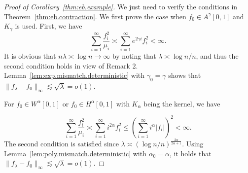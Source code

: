 \documentclass[12pt]{article}
\newcommand{\s}{\sum_{i=1}^{\infty}}
\theoremstyle{plain}
\theoremstyle{nonitalicremark}
\begin{document}
\begin{appendices}
\begin{proof}[Proof of Corollary~\ref{thm:eb.example}]
We just need to verify the conditions in Theorem~\ref{thm:eb.contraction}. We first prove the case when $f_0 \in A^\gamma[0,1]$ and $K_\gamma$ is used. First, we have
\begin{equation}
\s \frac{f_i^2}{\mu_i} \asymp \s e^{2\gamma i} f_i^2 < \infty. 
\end{equation}
It is obvious that $n\lambda \asymp \log n \to \infty$ by noting that $\lambda \asymp \log n/n$, and thus the second condition holds in view of Remark 2. Lemma~\ref{lem:exp.mismatch.deterministic} with $\gamma_0 = \gamma$ shows that $\|f_\lambda - f_0\|_\infty \lesssim \sqrt{\lambda} = o(1)$.

For $f_0 \in W^\alpha[0,1]$ or $f_0 \in H^\alpha[0,1]$ with $K_\alpha$ being the kernel, we have

\begin{equation}
\s \frac{f_i^2}{\mu_i} \asymp \s i^{2\alpha} f_i^2 \leq \left(\s i^\alpha |f_i|\right)^2 <  \infty.
\end{equation}
The second condition is satisfied since $\lambda \asymp (\log n/n)^{\frac{2\alpha}{2\alpha+1}}$. Using Lemma~\ref{lem:poly.mismatch.deterministic} with $\alpha_0 = \alpha$, it holds that $\|f_\lambda - f_0\|_\infty \lesssim \sqrt{\lambda} = o(1)$. 
\end{proof}




\end{appendices}
\end{document}
